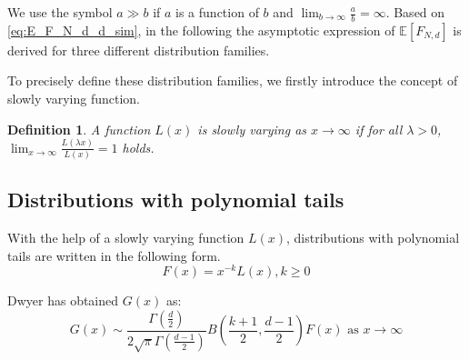 \documentclass[conference,a4paper]{IEEEtran}
\def\E{\mathbb{E}}
\newtheorem{definition}{Definition}
\begin{document}
We use the symbol $a \gg b$ if $a$ is a function of $b$ and $\lim_{b\to \infty} \frac{a}{b} = \infty$.
Based on \eqref{eq:E_F_N_d_d_sim}, in the following
the asymptotic expression of $\E[F_{N,d}]$ is derived
for three different distribution families.

To precisely define these distribution families, we firstly introduce the concept of slowly varying function.
\begin{definition}
A function $L(x)$ is
slowly varying as $x\to \infty$
if for all $\lambda>0$,
$\lim_{x\to\infty}\frac{L(\lambda x)}{L(x)}=1$
holds.
\end{definition}

\subsection{Distributions with polynomial tails}

With the help of a slowly varying function $L(x)$,
distributions with polynomial tails are written
in the following form.
\begin{equation}\label{eq:F_poly_tail}
     F(x) = x^{-k} L(x), k\geq 0
\end{equation}

Dwyer\cite{dwyer1991convex} has obtained $G(x)$ as:
\begin{equation}\label{eq:g_poly_tail}
     G(x) \sim \frac{\Gamma(\frac{d}{2})}{2\sqrt{\pi} \Gamma(\frac{d-1}{2})}
     B\left(\frac{k+1}{2}, \frac{d-1}{2}\right) F(x)  \textrm{ as } x\to \infty
\end{equation}
\end{document}

